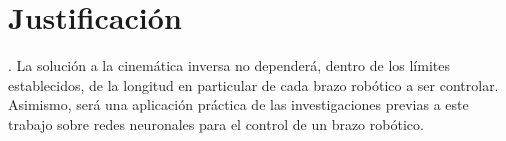 \section{Justificación}

. La solución a la cinemática inversa no dependerá, dentro de los límites establecidos, de la longitud en particular de cada brazo robótico a ser controlar. Asimismo, será una aplicación práctica de las investigaciones previas a este trabajo sobre redes neuronales para el control de un brazo robótico.
